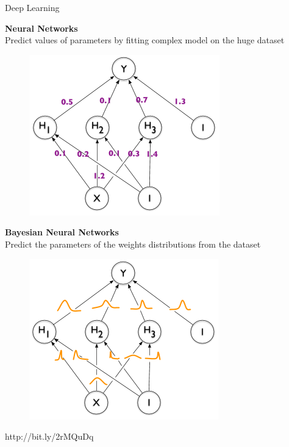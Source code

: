 \documentclass{beamer}
\begin{document}
\begin{frame}{Deep Learning}	
	\begin{minipage}[t]{0.47\columnwidth}
		\textbf{Neural Networks} \\Predict values of parameters by fitting complex model on the huge dataset
		\begin{figure}
			\includegraphics[width=1\columnwidth]{pres_pics/BNN_1}
		\end{figure}
	\end{minipage}
	\hfill
	\begin{minipage}[t]{0.47\columnwidth}
		\textbf{Bayesian Neural Networks} \\Predict the parameters of the weights distributions from the dataset
		\vspace{0.07cm}
		\begin{figure}
			\includegraphics[width=1\columnwidth]{pres_pics/BNN_2}
		\end{figure}
	\end{minipage}
	\vfill
	\hrulefill
	
	\scriptsize{http://bit.ly/2rMQuDq}
	
\end{frame}
\end{document}
